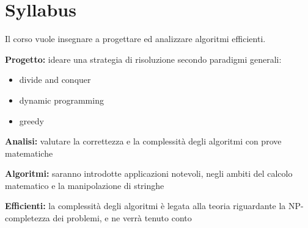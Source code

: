\section*{Syllabus}

Il corso vuole insegnare a progettare ed analizzare algoritmi efficienti.

\begin{description}
    \item{\textbf{Progetto:}} ideare una strategia di risoluzione secondo paradigmi generali:
        \begin{itemize}
            \item divide and conquer
            \item dynamic programming
            \item greedy
        \end{itemize}
    \item{\textbf{Analisi:}} valutare la correttezza e la complessità degli algoritmi con prove matematiche
    \item{\textbf{Algoritmi:}} saranno introdotte applicazioni notevoli, negli ambiti del calcolo matematico e la manipolazione di stringhe
    \item{\textbf{Efficienti:}} la complessità degli algoritmi è legata alla teoria riguardante la NP-completezza dei problemi, e ne verrà tenuto conto
\end{description}


